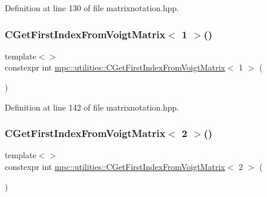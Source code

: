 Definition at line 130 of file matrixnotation.\+hpp.

\mbox{\label{namespacempc_1_1utilities_a9d279abaf7dfef3e9192f7b778eb68fa}} 
\subsubsection{\texorpdfstring{C\+Get\+First\+Index\+From\+Voigt\+Matrix$<$ 1 $>$()}{CGetFirstIndexFromVoigtMatrix< 1 >()}}
{\footnotesize\ttfamily template$<$$>$ \\
constexpr int \mbox{\hyperlink{namespacempc_1_1utilities_acb1091d4fd58c0821eeeba68a43146ac}{mpc\+::utilities\+::\+C\+Get\+First\+Index\+From\+Voigt\+Matrix}}$<$ 1 $>$ (\begin{DoxyParamCaption}{ }\end{DoxyParamCaption})\hspace{0.3cm}{\ttfamily [inline]}}



Definition at line 142 of file matrixnotation.\+hpp.

\mbox{\label{namespacempc_1_1utilities_a9c173e2ecba984e738a4a21047fc78f7}} 
\subsubsection{\texorpdfstring{C\+Get\+First\+Index\+From\+Voigt\+Matrix$<$ 2 $>$()}{CGetFirstIndexFromVoigtMatrix< 2 >()}}
{\footnotesize\ttfamily template$<$$>$ \\
constexpr int \mbox{\hyperlink{namespacempc_1_1utilities_acb1091d4fd58c0821eeeba68a43146ac}{mpc\+::utilities\+::\+C\+Get\+First\+Index\+From\+Voigt\+Matrix}}$<$ 2 $>$ (\begin{DoxyParamCaption}{ }\end{DoxyParamCaption})\hspace{0.3cm}{\ttfamily [inline]}}



